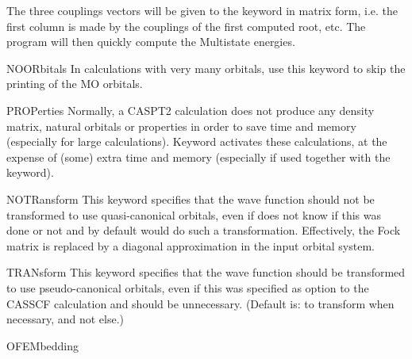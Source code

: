 \begin{keywordlist}
The three couplings vectors will be given to the 
keyword in matrix form, i.e. the first column is made by the
couplings of the first computed root, etc.
The program will then quickly compute the Multistate energies.
\item[NOORbitals]
In calculations with very many orbitals, use this keyword to skip the
printing of the MO orbitals.
\item[PROPerties]
Normally, a CASPT2 calculation does not produce any density matrix,
natural orbitals or properties in order to save time and memory
(especially for large calculations).
Keyword  activates these calculations, at the expense of (some)
extra time and memory (especially if used together with the  keyword).
\item[NOTRansform]
This keyword specifies that the wave function should not be transformed
to use quasi-canonical orbitals, even if  does not know if this
was done or not and by default would do such a transformation.
Effectively, the Fock matrix is replaced by a diagonal
approximation in the input orbital system.
\item[TRANsform]
This keyword specifies that the wave function should be transformed
to use pseudo-canonical orbitals, even if this was specified
as option to the CASSCF calculation and should be unnecessary.
(Default is: to transform when necessary, and not else.)
\item[OFEMbedding]

\end{keywordlist}
